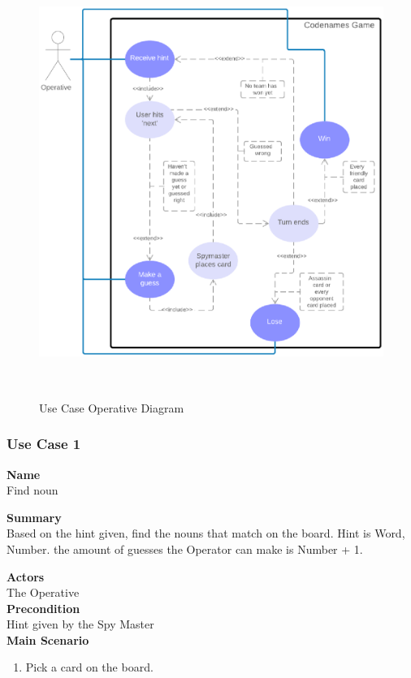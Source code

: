 \documentclass[12pt]{article}
\begin{document}
\begin{figure}[htbp]
\centering
\includegraphics[width=16cm,height=14cm]{operative_ucd}
\caption{Use Case Operative Diagram}
\label{fig:use-case-operative}
\end{figure}
\newpage
\subsubsection{Use Case 1} \label{uc:1}

\noindent
{\bf Name}\\
Find noun

\noindent
{\bf Summary}\\
Based on the hint given, find the nouns that match on the board. Hint is Word, Number. the amount of guesses the Operator can make is Number + 1.

\noindent
{\bf Actors}\\
The Operative\\
\noindent
{\bf Precondition}\\
Hint given by the Spy Master\\
\noindent
{\bf Main Scenario}\\
\vspace*{-0.2in}
\begin{enumerate}
\item Pick a card on the board.
\end{enumerate}
\end{document}
